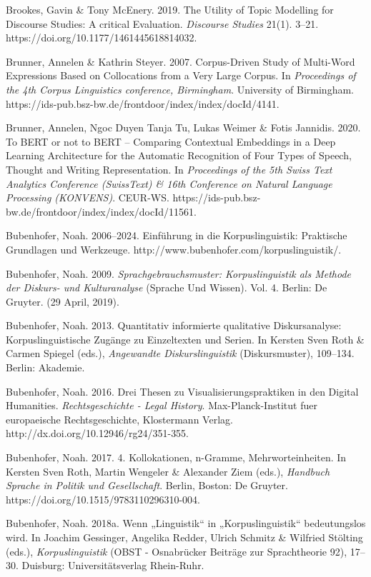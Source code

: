 Brookes, Gavin \& Tony McEnery. 2019. The Utility of Topic Modelling for Discourse Studies: A critical Evaluation. \emph{Discourse Studies} 21(1). 3--21. https://doi.org/10.1177/1461445618814032.

Brunner, Annelen \& Kathrin Steyer. 2007. Corpus-Driven Study of Multi-Word Expressions Based on Collocations from a Very Large Corpus. In \emph{Proceedings of the 4th Corpus Linguistics conference, Birmingham}. University of Birmingham. https://ids-pub.bsz-bw.de/frontdoor/index/index/docId/4141.

Brunner, Annelen, Ngoc Duyen Tanja Tu, Lukas Weimer \& Fotis Jannidis. 2020. To BERT or not to BERT -- Comparing Contextual Embeddings in a Deep Learning Architecture for the Automatic Recognition of Four Types of Speech, Thought and Writing Representation. In \emph{Proceedings of the 5th Swiss Text Analytics Conference (SwissText) \& 16th Conference on Natural Language Processing (KONVENS)}. CEUR-WS. https://ids-pub.bsz-bw.de/frontdoor/index/index/docId/11561.

Bubenhofer, Noah. 2006--2024. Einführung in die Korpuslinguistik: Praktische Grundlagen und Werkzeuge. http://www.bubenhofer.com/korpuslinguistik/.

Bubenhofer, Noah. 2009. \emph{Sprachgebrauchsmuster: Korpuslinguistik als Methode der Diskurs- und Kulturanalyse} (Sprache Und Wissen). Vol. 4. Berlin: De Gruyter. (29 April, 2019).

Bubenhofer, Noah. 2013. Quantitativ informierte qualitative Diskursanalyse: Korpuslinguistische Zugänge zu Einzeltexten und Serien. In Kersten Sven Roth \& Carmen Spiegel (eds.), \emph{Angewandte Diskurslinguistik} (Diskursmuster), 109--134. Berlin: Akademie.

Bubenhofer, Noah. 2016. Drei Thesen zu Visualisierungspraktiken in den Digital Humanities. \emph{Rechtsgeschichte - Legal History}. Max-Planck-Institut fuer europaeische Rechtsgeschichte, Klostermann Verlag. http://dx.doi.org/10.12946/rg24/351-355.

Bubenhofer, Noah. 2017. 4. Kollokationen, n-Gramme, Mehrworteinheiten. In Kersten Sven Roth, Martin Wengeler \& Alexander Ziem (eds.), \emph{Handbuch Sprache in Politik und Gesellschaft}. Berlin, Boston: De Gruyter. https://doi.org/10.1515/9783110296310-004.

Bubenhofer, Noah. 2018a. Wenn „Linguistik`` in „Korpuslinguistik`` bedeutungslos wird. In Joachim Gessinger, Angelika Redder, Ulrich Schmitz \& Wilfried Stölting (eds.), \emph{Korpuslinguistik} (OBST - Osnabrücker Beiträge zur Sprachtheorie 92), 17--30. Duisburg: Universitätsverlag Rhein-Ruhr.

